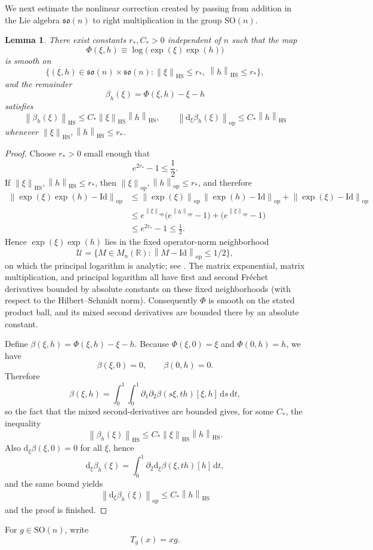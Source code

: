 \documentclass[11pt, reqno]{amsart}
\numberwithin{equation}{section}
\newtheorem{lemma}{Lemma}
\theoremstyle{remark}
\newcommand{\R}{\mathbb{R}}
\newcommand{\1}{\mathbf{1}}
\newcommand{\SO}{\mathrm{SO}}
\newcommand{\so}{\mathfrak{so}}
\newcommand{\Id}{\mathrm{Id}}
\newcommand{\HS}{\mathrm{HS}}
\newcommand{\op}{\mathrm{op}}
\newcommand{\dd}{\mathrm{d}}
\newcommand{\norm}[1]{\left\lVert #1\right\rVert}
\begin{document}
We next estimate the nonlinear correction created by passing from addition in the Lie algebra $\so(n)$
to right multiplication in the group $\SO(n)$.

\begin{lemma}
\label{lem:bch-remainder}
There exist constants $r_\ast,C_\ast>0$ independent of $n$ such that the map
\[
\Phi(\xi,h) \equiv \log\!\bigl(\exp(\xi)\exp(h)\bigr)
\]
is smooth on
\[
\{(\xi,h)\in \so(n)\times \so(n): \norm{\xi}_{\HS}\le r_\ast,\ \norm{h}_{\HS}\le r_\ast\},
\]
and the remainder
\begin{equation} \label{EqDefRemainderLemma6}
\beta_h(\xi)=\Phi(\xi,h)-\xi-h
\end{equation}
satisfies
\begin{equation}
\label{eq:bch-remainder}
\norm{\beta_h(\xi)}_{\HS}\le C_\ast \norm{\xi}_{\HS}\norm{h}_{\HS},
\qquad
\norm{\dd_\xi \beta_h(\xi)}_{\op}\le C_\ast \norm{h}_{\HS}
\end{equation}
whenever $\norm{\xi}_{\HS},\norm{h}_{\HS}\le r_\ast$.
\end{lemma}

\begin{proof}
Choose $r_\ast>0$ small enough that
\[
e^{2r_\ast}-1\le \frac12.
\]
If $\norm{\xi}_{\HS},\norm{h}_{\HS}\le r_\ast$, then $\norm{\xi}_{\op},\norm{h}_{\op}\le r_\ast$, and therefore
\begin{align*}
\norm{\exp(\xi)\exp(h)-\Id}_{\op}
&\le
\norm{\exp(\xi)}_{\op}\,\norm{\exp(h)-\Id}_{\op}+\norm{\exp(\xi)-\Id}_{\op} \\
&\le e^{\norm{\xi}_{\op}}\bigl(e^{\norm{h}_{\op}}-1\bigr)+\bigl(e^{\norm{\xi}_{\op}}-1\bigr) \\
& \le e^{2r_\ast}-1 \le \frac12.
\end{align*}
Hence $\exp(\xi)\exp(h)$ lies in the fixed operator-norm neighborhood
\[
\mathcal U=\{M\in M_n(\R): \norm{M-\Id}_{\op}\le 1/2\},
\]
on which the principal logarithm is analytic; see \cite[Chapter~1]{high:FM}. The matrix exponential, matrix multiplication, and principal logarithm all have first and second Fr\'echet derivatives bounded by absolute constants on these fixed neighborhoods (with respect to the Hilbert--Schmidt norm). Consequently $\Phi$ is smooth on the stated product ball, and its mixed second derivatives are bounded there by an absolute constant.

Define $\beta(\xi,h)=\Phi(\xi,h)-\xi-h$.
Because $\Phi(\xi,0)=\xi$ and $\Phi(0,h)=h$, we have
\[
\beta(\xi,0)=0,
\qquad
\beta(0,h)=0.
\]
Therefore
\[
\beta(\xi,h)
=
\int_0^1\!\int_0^1 \partial_1\partial_2\beta(s\xi,th)[\xi,h]\,\dd s\,\dd t,
\]
so the fact that the mixed second-derivatives are bounded gives, for some $C_{\ast}$, the inequality
\[
\norm{\beta_h(\xi)}_{\HS}\le C_\ast \norm{\xi}_{\HS}\norm{h}_{\HS}.
\]
Also $\dd_\xi\beta(\xi,0)=0$ for all $\xi$, hence
\[
\dd_\xi \beta_h(\xi)
=
\int_0^1 \partial_2\dd_\xi\beta(\xi,th)[h]\,\dd t,
\]
and the same bound yields
\[
\norm{\dd_\xi \beta_h(\xi)}_{\op}\le C_\ast \norm{h}_{\HS}
\]
and the proof is finished.
\end{proof}
For $g\in \SO(n)$, write
\[
T_g(x)=xg.
\]
\end{document}
